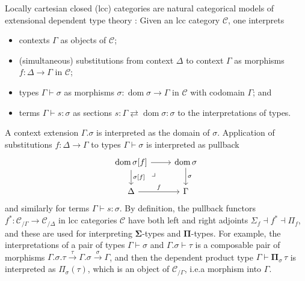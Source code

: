 \documentclass[a4paper]{article}
\theoremstyle{remark}
\theoremstyle{definition}
\begin{document}
Locally cartesian closed (lcc) categories are natural categorical models of extensional dependent type theory \cite{lcc-categories-and-type-theory}:
Given an lcc category $\mathcal{C}$, one interprets
\begin{itemize}
  \item
    contexts $\Gamma$ as objects of $\mathcal{C}$;
  \item
    (simultaneous) substitutions from context $\Delta$ to context $\Gamma$ as morphisms $f : \Delta \rightarrow \Gamma$ in $\mathcal{C}$;
  \item
    types $\Gamma \vdash \sigma$ as morphisms $\sigma : \operatorname{dom} \sigma \rightarrow \Gamma$ in $\mathcal{C}$ with codomain $\Gamma$; and
  \item
    terms $\Gamma \vdash s : \sigma$ as sections $s : \Gamma \rightleftarrows \operatorname{dom} \sigma : \sigma$ to the interpretations of types.
\end{itemize}
A context extension $\Gamma.\sigma$ is interpreted as the domain of $\sigma$.
Application of substitutions $f : \Delta \rightarrow \Gamma$ to types $\Gamma \vdash \sigma$ is interpreted as pullback
\begin{equation}
  \begin{tikzcd}
    \operatorname{dom} \sigma[f] \arrow[r] \arrow[d, "{\sigma[f]}"] \arrow[dr, phantom, near start, "\lrcorner"] & \operatorname{dom} \sigma \arrow[d, "\sigma"] \\
    \Delta \arrow[r, "f"] & \Gamma
  \end{tikzcd}
\end{equation}
and similarly for terms $\Gamma \vdash s : \sigma$.
By definition, the pullback functors $f^* : \mathcal{C}_{/ \Gamma} \rightarrow \mathcal{C}_{/ \Delta}$ in lcc categories $\mathcal{C}$ have both left and right adjoints $\Sigma_f \dashv f^* \dashv \Pi_f$, and these are used for interpreting $\mathbf{\Sigma}$-types and $\mathbf{\Pi}$-types.
For example, the interpretations of a pair of types $\Gamma \vdash \sigma$ and $\Gamma.\sigma \vdash \tau$ is a composable pair of morphisms $\Gamma.\sigma.\tau \xrightarrow{\tau} \Gamma.\sigma \xrightarrow{\sigma} \Gamma$, and then the dependent product type $\Gamma \vdash \mathbf{\Pi}_\sigma \, \tau$ is interpreted as $\Pi_\sigma(\tau)$, which is an object of $\mathcal{C}_{/ \Gamma}$, i.e.\@ a morphism into $\Gamma$.
\end{document}
